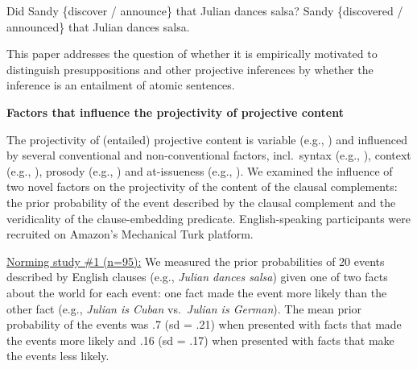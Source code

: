 \documentclass[12pt,fleqn]{article}
\newcommand{\6}{\mbox{$[\hspace*{-.6mm}[$}}
\newcommand{\9}{\mbox{$]\hspace*{-.6mm}]$}}
\begin{document}
\vspace*{-.2cm}
\begin{exe}
\ex
\begin{xlist}
\ex\label{embedded} Did Sandy \{discover / announce\} that Julian dances salsa?
\ex\label{unembedded} Sandy \{discovered / announced\} that Julian dances salsa.
\end{xlist}
\end{exe}
\vspace*{-.2cm}

This paper addresses the question of whether it is empirically motivated to distinguish presuppositions and other projective inferences by whether the inference is an entailment of atomic sentences.

{\bf Factors that influence the projectivity of projective content}

The projectivity of (entailed) projective content is variable (e.g., \citealt{karttunen71b,kadmon01,tbd-variability}) and influenced by several conventional and non-conventional factors, incl.\ syntax (e.g., \citealt{potts05}), context (e.g., \citealt{beaver-belly}), prosody (e.g., \citealt{cummins-rohde2015,tonhauser-salt26}) and at-issueness (e.g., \citealt{tbd-variability}). We examined the influence of two novel factors on the projectivity of the content of the clausal complements: the prior probability of the event described by the clausal complement and the veridicality of the clause-embedding predicate. English-speaking participants were recruited on Amazon's Mechanical Turk platform.

\underline{Norming study \#1 (n=95):} We measured the prior probabilities of 20 events described by English clauses (e.g., {\em Julian dances salsa}) given one of two facts about the world for each event: one fact made the event more likely than the other fact (e.g., {\em Julian is Cuban} vs.\ {\em Julian is German}). The mean prior probability of the events was .7 (sd = .21) when presented with facts that made the events more likely and .16 (sd = .17) when presented with facts that make the events less likely.
\end{document}
